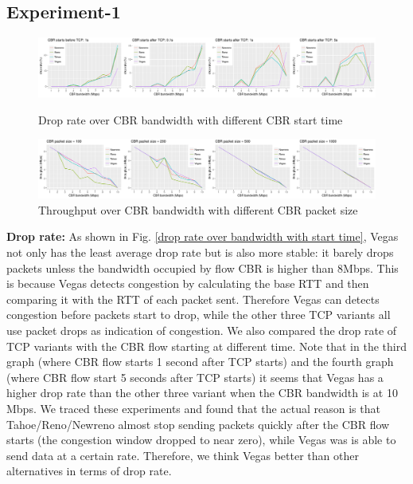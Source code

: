 \documentclass[USenglish,oneside,twocolumn]{article}
\begin{document}
\subsection{Experiment-1}
\begin{figure}
	\centering
	\includegraphics[width=\linewidth]{fig/experiment1/drop_rate.pdf}
	\captionsetup{justification=centering}
	\caption{Drop rate over CBR bandwidth with different CBR start time}
	\label{drop rate over bandwidth with start time}
	
	
	
	\includegraphics[width=\linewidth]{fig/experiment1/throughput.pdf}
	\captionsetup{justification=centering}
	\caption{Throughput over CBR bandwidth with different CBR packet size}
	\label{throughput over bandwidth with packet size}
\end{figure}

\noindent \textbf{Drop rate:}
As shown in Fig. \ref{drop rate over bandwidth with start time}, Vegas not only has the least average drop rate but is also more stable: it barely drops packets unless the bandwidth occupied by flow CBR is higher than 8Mbps. This is because Vegas detects congestion by calculating the base RTT and then comparing it with the RTT of each packet sent. Therefore Vegas can detects congestion before packets start to drop, while the other three TCP variants all use packet drops as indication of congestion. We also compared the drop rate of TCP variants with the CBR flow starting at different time. Note that in the third graph (where CBR flow starts 1 second after TCP starts) and the fourth graph (where CBR flow start 5 seconds after TCP starts) it seems that Vegas has a higher drop rate than the other three variant when the CBR bandwidth is at 10 Mbps. We traced these experiments and found that the actual reason is that Tahoe/Reno/Newreno almost stop sending packets quickly after the CBR flow starts (the congestion window dropped to near zero), while Vegas was is able to send data at a certain rate. Therefore, we think Vegas better than other alternatives in terms of drop rate.
\end{document}
